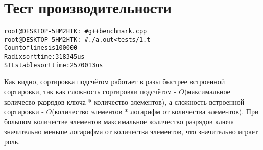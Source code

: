 \section{Тест производительности}

\begin{alltt}
root@DESKTOP-5HM2HTK:~# g++ benchmark.cpp
root@DESKTOP-5HM2HTK:~# ./a.out <tests/1.t
Count of lines is 100000
Radix sort time: 318345us
STL stable sort time: 2570013us
\end{alltt}

Как видно, сортировка подсчётом работает в разы быстрее встроенной сортировки, так как сложность сортировки подсчётом - $O$(максимальное количесво разрядов ключа * количество элементов), а сложность встроенной сортировки - $O$(количество элементов * логарифм от количества элементов). При большом количестве элементов максимальное количество разрядов ключа значительно меньше логарифма от количества элементов, что значительно играет роль.

\pagebreak

